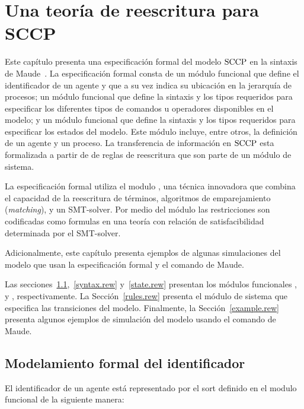 
\chapter{Una teor\'ia de reescritura para SCCP}
\label{chapter.rew}

Este cap\'itulo presenta una especificaci\'on formal del modelo $\textnormal{SCCP}$ en la sintaxis de Maude~\cite{maude-book}. La especificaci\'on formal consta de un m\'odulo funcional que define el identificador de un agente y que a su vez indica su ubicaci\'on en la jerarqu\'ia de procesos; un m\'odulo funcional que define la sintaxis y los tipos requeridos para especificar los diferentes tipos de comandos u operadores disponibles en el modelo; y un m\'odulo funcional que define la sintaxis y los tipos requeridos para especificar los estados del modelo. Este m\'odulo incluye, entre otros, la definici\'on de un agente y un proceso. La transferencia de informaci\'on en $\textnormal{SCCP}$ esta formalizada a partir de de reglas de reescritura que son parte de un m\'odulo de sistema.

La especificaci\'on formal utiliza el modulo , una t\'ecnica innovadora que combina el capacidad de la reescritura de t\'erminos, algoritmos de emparejamiento (\textit{matching}), y un SMT-solver. Por medio del m\'odulo  las restricciones son codificadas como formulas en una teor\'ia con relaci\'on de satisfacibilidad determinada por el SMT-solver.

Adicionalmente, este cap\'itulo presenta ejemplos de algunas simulaciones del modelo que usan la especificaci\'on formal y el comando  de Maude.

Las secciones~\ref{aid.rew},~\ref{syntax.rew} y~\ref{state.rew} presentan los m\'odulos funcionales ,  y , respectivamente. La Secci\'on~\ref{rules.rew} presenta el m\'odulo de sistema  que especifica las transiciones del modelo. Finalmente, la Secci\'on~\ref{example.rew} presenta algunos ejemplos de simulaci\'on del modelo usando el comando  de Maude.

\section{Modelamiento formal del identificador}
\label{aid.rew}

El identificador de un agente est\'a representado por el sort  definido en el modulo funcional  de la siguiente manera:

